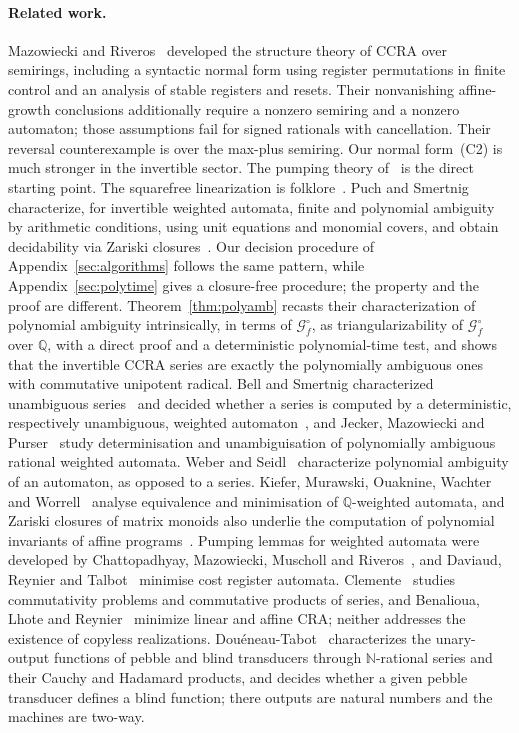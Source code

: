 \documentclass[11pt,letterpaper]{article}
\newcommand{\Q}{\mathbb{Q}}
\newcommand{\N}{\mathbb{N}}
\newcommand{\cG}{\mathcal{G}}
\theoremstyle{definition}
\begin{document}
\paragraph{Related work.}
Mazowiecki and Riveros~\cite{MR16,MR19} developed the structure theory of CCRA over semirings, including a syntactic normal form using register permutations in finite control and an analysis of stable registers and resets. Their nonvanishing affine-growth conclusions additionally require a nonzero semiring and a nonzero automaton; those assumptions fail for signed rationals with cancellation. Their reversal counterexample is over the max-plus semiring. Our normal form~(C2) is much stronger in the invertible sector. The pumping theory of~\cite{MPS26} is the direct starting point. The squarefree linearization is folklore~\cite[Lemma~50]{MPSfull}. Puch and Smertnig~\cite{PS24} characterize, for invertible weighted automata, finite and polynomial ambiguity by arithmetic conditions, using unit equations and monomial covers, and obtain decidability via Zariski closures~\cite{DJK05,NPSSW22}. Our decision procedure of Appendix~\ref{sec:algorithms} follows the same pattern, while Appendix~\ref{sec:polytime} gives a closure-free procedure; the property and the proof are different. Theorem~\ref{thm:polyamb} recasts their characterization of polynomial ambiguity intrinsically, in terms of $\cG_f^\circ$, as triangularizability of $\cG_f^\circ$ over $\Q$, with a direct proof and a deterministic polynomial-time test, and shows that the invertible CCRA series are exactly the polynomially ambiguous ones with commutative unipotent radical. Bell and Smertnig characterized unambiguous series~\cite{BS21} and decided whether a series is computed by a deterministic, respectively unambiguous, weighted automaton~\cite{BS23}, and Jecker, Mazowiecki and Purser~\cite{JMP24} study determinisation and unambiguisation of polynomially ambiguous rational weighted automata. Weber and Seidl~\cite{WS91} characterize polynomial ambiguity of an automaton, as opposed to a series. Kiefer, Murawski, Ouaknine, Wachter and Worrell~\cite{KMOWW13} analyse equivalence and minimisation of $\Q$-weighted automata, and Zariski closures of matrix monoids also underlie the computation of polynomial invariants of affine programs~\cite{HOPW18}. Pumping lemmas for weighted automata were developed by Chattopadhyay, Mazowiecki, Muscholl and Riveros~\cite{CMMR21}, and Daviaud, Reynier and Talbot~\cite{DRT16} minimise cost register automata. Clemente~\cite{C25,clemente:LIPIcs.LICS.2026.29} studies commutativity problems and commutative products of series, and Benalioua, Lhote and Reynier~\cite{benalioua_et_al:LIPIcs.MFCS.2024.23} minimize linear and affine CRA; neither addresses the existence of copyless realizations. Douéneau-Tabot~\cite{doueneautabot:LIPIcs.ICALP.2022.120} characterizes the unary-output functions of pebble and blind transducers through $\N$-rational series and their Cauchy and Hadamard products, and decides whether a given pebble transducer defines a blind function; there outputs are natural numbers and the machines are two-way.
\end{document}
